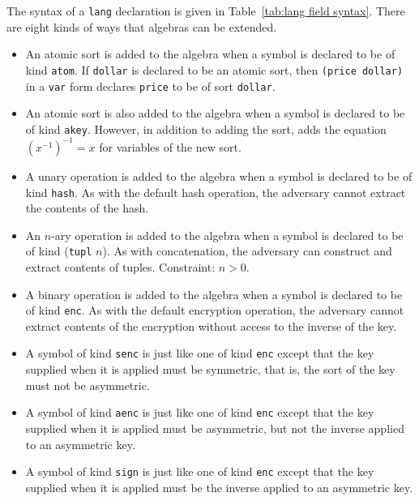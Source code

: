 \documentclass[12pt]{article}
\begin{document}
The syntax of a \texttt{lang} declaration is given
in Table~\ref{tab:lang field syntax}.  There are eight kinds of ways
that {\cpsa} algebras can be extended.

\begin{itemize}

\item An atomic sort is added to the algebra when a symbol is declared
  to be of kind \texttt{atom}.  If \texttt{dollar} is declared to be
  an atomic sort, then \verb|(price dollar)| in a \texttt{var} form
  declares \texttt{price} to be of sort \texttt{dollar}.

\item An atomic sort is also added to the algebra when a symbol is declared
  to be of kind \texttt{akey}.  However, in addition to adding the
  sort, {\cpsa} adds the equation $(x^{-1})^{-1}=x$ for variables of
  the new sort.

\item A unary operation is added to the algebra when a symbol is
  declared to be of kind \texttt{hash}.  As with the default hash
  operation, the adversary cannot extract the contents of the hash.

\item An $n$-ary operation is added to the algebra when a symbol is
  declared to be of kind (\texttt{tupl} $n$).  As with concatenation,
 the adversary can construct and extract contents of tuples.
 Constraint: $n>0$.

\item A binary operation is added to the algebra when a symbol is
  declared to be of kind \texttt{enc}.  As with the default encryption
  operation, the adversary cannot extract contents of the encryption
  without access to the inverse of the key.

\item A symbol of kind \texttt{senc} is just like one of kind
  \texttt{enc} except that the key supplied when it is applied must be
  symmetric, that is, the sort of the key must not be asymmetric.

\item A symbol of kind \texttt{aenc} is just like one of kind
  \texttt{enc} except that the key supplied when it is applied must be
  asymmetric, but not the inverse applied to an asymmetric key.
  
\item A symbol of kind \texttt{sign} is just like one of kind
  \texttt{enc} except that the key supplied when it is applied must be
  the inverse applied to an asymmetric key.

\end{itemize}
\end{document}
